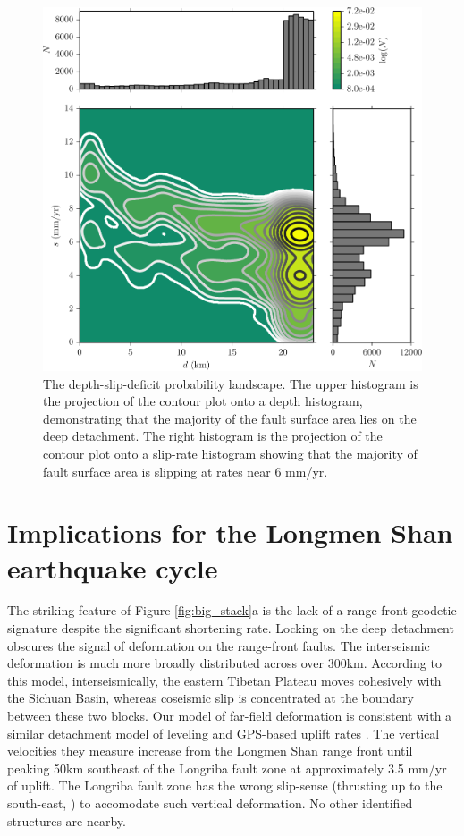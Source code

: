 \documentclass[12pt]{article}
\begin{document}
\begin{figure}[h!]
    \centering
    \includegraphics{figs/depth_slip_contour.pdf}
    \caption{The depth-slip-deficit probability landscape. The upper histogram is the projection of the contour plot onto a depth histogram, demonstrating that the majority of the fault surface area lies on the deep detachment. The right histogram is the projection of the contour plot onto a slip-rate histogram showing that the majority of fault surface area is slipping at rates near 6 mm/yr.}
    \label{fig:distribution}
\end{figure}

\section{Implications for the Longmen Shan earthquake cycle}
The striking feature of Figure \ref{fig:big_stack}a is the lack of a range-front geodetic signature despite the significant shortening rate. Locking on the deep detachment obscures the signal of deformation on the range-front faults. The interseismic deformation is much more broadly distributed across over 300km. According to this model, interseismically, the eastern Tibetan Plateau moves cohesively with the Sichuan Basin, whereas coseismic slip is concentrated at the boundary between these two blocks.  Our model of far-field deformation is consistent with a similar detachment model of leveling and GPS-based uplift rates \citep{Hao2014}. The vertical velocities they measure increase from the Longmen Shan range front until peaking 50km southeast of the Longriba fault zone at approximately 3.5 mm/yr of uplift. The Longriba fault zone has the wrong slip-sense (thrusting up to the south-east, \citep{Ren2013}) to accomodate such vertical deformation. No other identified structures are nearby. 
\end{document}
